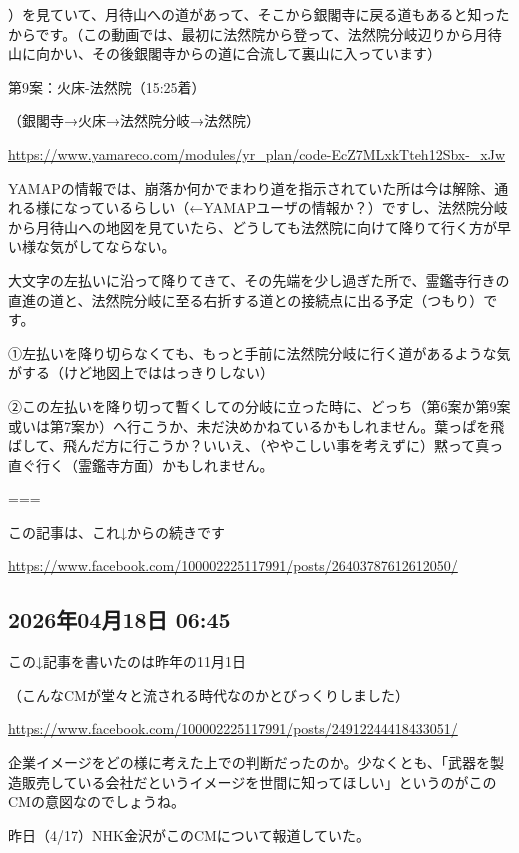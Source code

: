 \documentclass[facebook_diary.tex]{subfiles}
\begin{document}
 ）を見ていて、月待山への道があって、そこから銀閣寺に戻る道もあると知ったからです。（この動画では、最初に法然院から登って、法然院分岐辺りから月待山に向かい、その後銀閣寺からの道に合流して裏山に入っています）


第9案：火床-法然院（15:25着）

（銀閣寺→火床→法然院分岐→法然院）

\url{https://www.yamareco.com/modules/yr_plan/code-EcZ7MLxkTteh12Sbx-_xJw}




YAMAPの情報では、崩落か何かでまわり道を指示されていた所は今は解除、通れる様になっているらしい（←YAMAPユーザの情報か？）ですし、法然院分岐から月待山への地図を見ていたら、どうしても法然院に向けて降りて行く方が早い様な気がしてならない。


大文字の左払いに沿って降りてきて、その先端を少し過ぎた所で、霊鑑寺行きの直進の道と、法然院分岐に至る右折する道との接続点に出る予定（つもり）です。

①左払いを降り切らなくても、もっと手前に法然院分岐に行く道があるような気がする（けど地図上でははっきりしない）

②この左払いを降り切って暫くしての分岐に立った時に、どっち（第6案か第9案或いは第7案か）へ行こうか、未だ決めかねているかもしれません。葉っぱを飛ばして、飛んだ方に行こうか？いいえ、（ややこしい事を考えずに）黙って真っ直ぐ行く（霊鑑寺方面）かもしれません。


===

この記事は、これ↓からの続きです

\url{https://www.facebook.com/100002225117991/posts/26403787612612050/}



\subsection*{2026年04月18日 06:45}

この↓記事を書いたのは昨年の11月1日

（こんなCMが堂々と流される時代なのかとびっくりしました）

\url{https://www.facebook.com/100002225117991/posts/24912244418433051/}



企業イメージをどの様に考えた上での判断だったのか。少なくとも、「武器を製造販売している会社だというイメージを世間に知ってほしい」というのがこのCMの意図なのでしょうね。


昨日（4/17）NHK金沢がこのCMについて報道していた。
\end{document}
